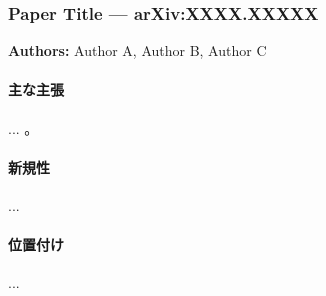 
\subsubsection{Paper Title --- arXiv:XXXX.XXXXX}

\textbf{Authors:} Author A, Author B, Author C

\paragraph{主な主張}
... \cite{BibTeXKey}。

\paragraph{新規性}
...

\paragraph{位置付け}
...
